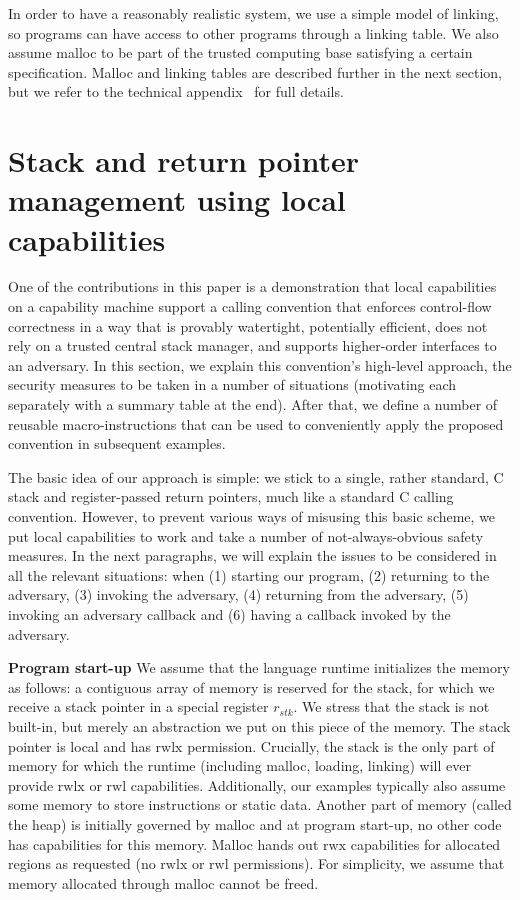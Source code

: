 \documentclass[compsoc,conference,letterpaper,fleqn]{IEEEtran}
\newcommand{\var}[1]{\mathit{#1}}
\newcommand{\stk}{\var{stk}}
\newcommand{\plainperm}[1]{\mathrm{#1}}
\newcommand{\rwx}{\plainperm{rwx}}
\newcommand{\readwritel}{\plainperm{rwl}}
\newcommand{\rwl}{\readwritel}
\newcommand{\rwlx}{\plainperm{rwlx}}
\begin{document}

In order to have a reasonably realistic system, we use a simple model of
linking, so programs can have access to other programs through a linking table.
We also assume malloc to be part of the trusted computing base satisfying a
certain specification. Malloc and linking tables are described further in the
next section, but we refer to the technical appendix~\cite{technical_appendix}
for full details.

\section{Stack and return pointer management using local capabilities}
\label{sec:stack-and-return-pointer}
One of the contributions in this paper is a demonstration that local
capabilities on a capability machine support a calling convention that enforces
control-flow correctness in a way that is provably watertight, potentially
efficient, does not rely on a trusted central stack manager, and supports
higher-order interfaces to an adversary. In this section, we explain this
convention's high-level approach, the security measures to be taken in a number
of situations (motivating each separately with a summary table at the end).
After that, we define a number of reusable macro-instructions that can be used
to conveniently apply the proposed convention in subsequent examples.

The basic idea of our approach is simple: we stick to a single, rather standard,
C stack and register-passed return pointers, much like a standard C calling
convention. However, to prevent various ways of misusing this basic scheme, we
put local capabilities to work and take a number of not-always-obvious safety
measures. In the next paragraphs, we will explain the issues to be considered in
all the relevant situations: when (1) starting our program, (2) returning to the
adversary, (3) invoking the adversary, (4) returning from the adversary, (5)
invoking an adversary callback and (6) having a callback invoked by the
adversary.

\textbf{Program start-up} We assume that the language runtime initializes the
memory as follows: a contiguous array of memory is reserved for the stack, for
which we receive a stack pointer in a special register $r_\stk$. We stress that
the stack is not built-in, but merely an abstraction we put on this piece of the
memory. The stack pointer is local and has $\rwlx$ permission. Crucially, the
stack is the only part of memory for which the runtime (including malloc,
loading, linking) will ever provide $\rwlx$ or $\rwl$ capabilities.
Additionally, our examples typically also assume some memory to store
instructions or static data. Another part of memory (called the heap) is
initially governed by malloc and at program start-up, no other code has
capabilities for this memory. Malloc hands out $\rwx$ capabilities for allocated
regions as requested (no $\rwlx$ or $\rwl$ permissions). For simplicity, we
assume that memory allocated through malloc cannot be freed.
\end{document}
